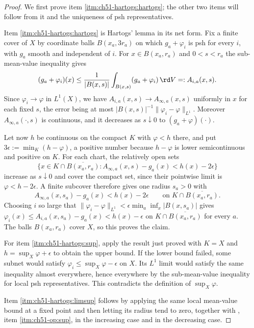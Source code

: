 \begin{proof}
We first prove item \cref{itm:ch51-hartogs:hartogs}; the other two
items will follow from it and the uniqueness of psh representatives.

Item \cref{itm:ch51-hartogs:hartogs} is Hartogs' lemma in its net form.
Fix a finite cover of $X$ by coordinate balls $B(x_a,3r_a)$ on which
$g_a+\varphi_i$ is psh for every $i$, with $g_a$ smooth and
independent of $i$.  For $x\in B(x_a,r_a)$ and $0<s<r_a$ the
sub-mean-value inequality gives
\[
 (g_a+\varphi_i)(x)
 \leq\frac{1}{|B(x,s)|}\int_{B(x,s)}(g_a+\varphi_i)\,\rd V
 =:A_{i,a}(x,s).
\]
Since $\varphi_i\to\varphi$ in $L^1(X)$, we have
$A_{i,a}(x,s)\to A_{\infty,a}(x,s)$ uniformly in $x$ for each fixed
$s$, the error being at most
$|B(x,s)|^{-1}\|\varphi_i-\varphi\|_{L^1}$.  Moreover
$A_{\infty,a}(\cdot,s)$ is continuous, and it decreases as
$s\downarrow0$ to $(g_a+\varphi)(\cdot)$.

Let now $h$ be continuous on the compact $K$ with $\varphi<h$ there,
and put $3\epsilon:=\min_K(h-\varphi)$, a positive number because
$h-\varphi$ is lower semicontinuous and positive on $K$.  For each chart, the relatively open sets
\[
 \{x\in K\cap\overline{B(x_a,r_a)}:
       A_{\infty,a}(x,s)-g_a(x)<h(x)-2\epsilon\}
\]
increase as $s\downarrow0$ and cover the compact set, since their
pointwise limit is $\varphi<h-2\epsilon$.  A finite subcover therefore
gives one radius $s_a>0$ with
\[
 A_{\infty,a}(x,s_a)-g_a(x)<h(x)-2\epsilon
 \qquad\text{on }K\cap\overline{B(x_a,r_a)} .
\]
Choosing $i$ so large that
$\|\varphi_i-\varphi\|_{L^1}<\epsilon\min_a\inf_x|B(x,s_a)|$ gives
$\varphi_i(x)\leq A_{i,a}(x,s_a)-g_a(x)<h(x)-\epsilon$ on
$K\cap\overline{B(x_a,r_a)}$ for every $a$.  The balls
$B(x_a,r_a)$ cover $X$, so this proves the claim.

For item \cref{itm:ch51-hartogs:sup}, apply the result just proved
with $K=X$ and $h=\sup_X\varphi+\epsilon$ to obtain the upper bound.
If the lower bound failed, some subnet would satisfy
$\varphi_i\leq\sup_X\varphi-\epsilon$ on $X$.  Its $L^1$ limit would
satisfy the same inequality almost everywhere, hence everywhere by the
sub-mean-value inequality for local psh representatives.  This contradicts
the definition of $\sup_X\varphi$.

Item \cref{itm:ch51-hartogs:limsup} follows by applying the same local
mean-value bound at a fixed point and then letting its radius tend to zero, together with , item
\cref{itm:ch51-op:sup}, in the increasing case and
 in the decreasing case.
\end{proof}

